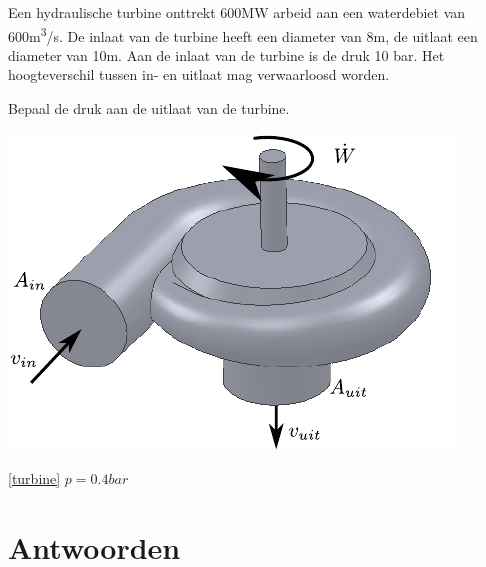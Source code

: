 \begin{toepassing}[*]
	\label{turbine}
Een hydraulische turbine onttrekt 600MW arbeid aan een waterdebiet van 600\unit{m^3/s}. De inlaat van de turbine heeft een diameter van 8m, de uitlaat een diameter van 10m. Aan de inlaat van de turbine is de druk 10 bar. Het hoogteverschil tussen in- en uitlaat mag verwaarloosd worden.

Bepaal de druk aan de uitlaat van de turbine.

	\centering
	\includegraphics{fig/behoudsvergelijkingen/turbine}
\end{toepassing}
\begin{antwoord}{\ref{turbine}}
	$p = 0.4\unit{bar}$
\end{antwoord}

\section*{Antwoorden}
	\begin{multicols}{2}
	\end{multicols}